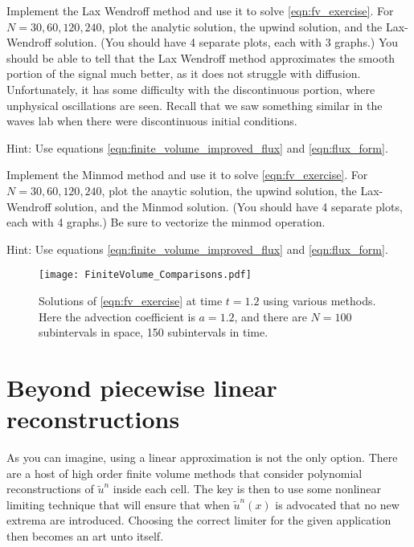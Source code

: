 
\begin{problem}
Implement the Lax Wendroff method and use it to solve \eqref{eqn:fv_exercise}.
For $N=30,60,120,240$, plot the analytic solution, the upwind solution, and the Lax-Wendroff solution.
(You should have 4 separate plots, each with 3 graphs.)
You should be able to tell that the Lax Wendroff method approximates the smooth portion of the signal much better, as it does not struggle with diffusion.
Unfortunately, it has some difficulty with the discontinuous portion, where unphysical oscillations are seen.
Recall that we saw something similar in the waves lab when there were discontinuous initial conditions.

Hint: Use equations \ref{eqn:finite_volume_improved_flux} and \ref{eqn:flux_form}.
\end{problem}

\begin{problem}
Implement the Minmod method and use it to solve \eqref{eqn:fv_exercise}.
For $N=30,60,120,240$, plot the anaytic solution, the upwind solution, the Lax-Wendroff solution, and the Minmod solution.
(You should have 4 separate plots, each with 4 graphs.)
Be sure to vectorize the minmod operation.

Hint: Use equations \ref{eqn:finite_volume_improved_flux} and \ref{eqn:flux_form}.
\end{problem}

\begin{figure}
\centering
\texttt{[image: FiniteVolume\_Comparisons.pdf]}
\caption{Solutions of \eqref{eqn:fv_exercise} at time $t = 1.2$ using various methods.
Here the advection coefficient is $a = 1.2$, and there are  $N = 100$ subintervals in space, 150 subintervals in time.}
\label{fig:fv_Comparisons}
\end{figure}

\section*{Beyond piecewise linear reconstructions}
As you can imagine, using a linear approximation is not the only option.
There are a host of high order finite volume methods that consider polynomial reconstructions of $\tilde{u}^n$ inside each cell.
The key is then to use some nonlinear limiting technique that will ensure that when $\tilde{u}^n(x)$ is advocated that no new extrema are introduced.
Choosing the correct limiter for the given application then becomes an art unto itself. 